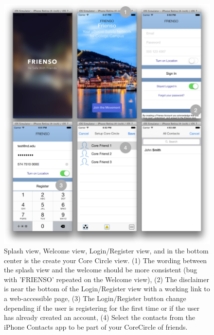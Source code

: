 \begin{figure}[!ht]
 \centering
  \includegraphics[width=\textwidth]{images/mvp_actual0.jpg}
	\caption{
	Splash view, Welcome view, Login/Register view, and in the bottom center is the 
	create your Core Circle view.  (1) The wording between the splash view and the 
	welcome should be more consistent (bug with 'FRIENSO' repeated on the Welcome view), 
	(2) The disclaimer is near the bottom of the Login/Register view with a working link 
	to a web-accessible page, (3) The Login/Register button change depending if the 
	user is registering for the first time or if the user has already created an account, 
	(4) Select the contacts from the iPhone Contacts app to be part of your CoreCircle 
	of friends.
	}
	\end{figure}
